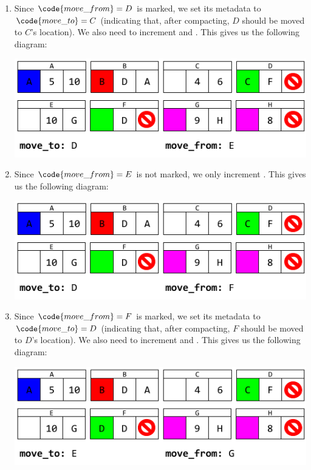 \begin{enumerate}
    \item Since $\code{move\_from} = D$ is marked, we set its metadata to $\code{move\_to} = C$ (indicating that, after compacting, $D$ should be moved to $C$'s location). We also need to increment  and . This gives us the following diagram: 
    \begin{center}
        \includegraphics[scale=0.6]{assets/GCAlg3_4.png}
    \end{center}

    \item Since $\code{move\_from} = E$ is not marked, we only increment . This gives us the following diagram: 
    \begin{center}
        \includegraphics[scale=0.6]{assets/GCAlg3_5.png}
    \end{center}

    \item Since $\code{move\_from} = F$ is marked, we set its metadata to $\code{move\_to} = D$ (indicating that, after compacting, $F$ should be moved to $D$'s location). We also need to increment  and . This gives us the following diagram: 
    \begin{center}
        \includegraphics[scale=0.6]{assets/GCAlg3_6.png}
    \end{center}


\end{enumerate}
